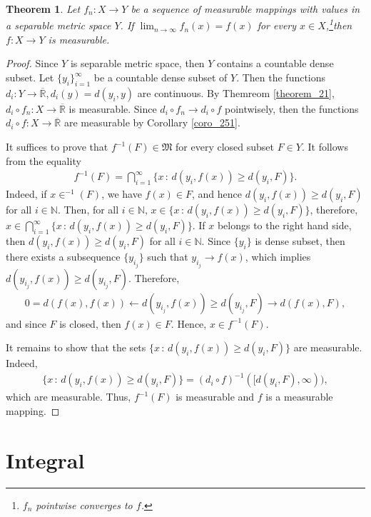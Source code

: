 \documentclass[11pt]{book}
\newtheorem{theorem}{Theorem}[chapter]
\theoremstyle{definition}
\numberwithin{equation}{chapter}
\begin{document}
\begin{theorem}\label{theorem_26}
Let $f_n: X \to Y$ be a sequence of measurable mappings with values in a separable metric space $Y$. If $\lim_{n\to\infty}f_n(x) = f(x)$ for every $x \in X$,\footnote{$f_n$ pointwise converges to $f$.}then $f: X \to Y$ is measurable.
\end{theorem}
\begin{proof}
Since $Y$ is separable metric space, then $Y$ contains a countable dense subset. Let $\{y_i\}^\infty_{i=1}$ be a countable dense subset of $Y$. Then the functions $d_i: Y \to \overline{\mathbb{R}}, d_i(y) = d(y_i,y)$ are continuous. By Themreom \ref{theorem_21}, $d_i \circ f_n: X \to \overline{\mathbb{R}}$ is measurable. Since $d_i \circ f_n \to d_i \circ f$ pointwisely, then the functions $d_i \circ f: X \to \overline{\mathbb{R}}$ are measurable by Corollary \ref{coro_251}. 

It suffices to prove that $f^{-1}(F) \in \mathfrak{M}$ for every closed subset $F \in Y$. It follows from the equality
\begin{align*}
    f^{-1}(F) = \bigcap^\infty_{i=1} \{x\,:\,d(y_i,f(x)) \geq d(y_i,F)\}.
\end{align*}
Indeed, if $x \in ^{-1}(F)$, we have $f(x) \in F$, and hence $d(y_i,f(x)) \geq d(y_i,F)$ for all $i \in \mathbb{N}$. Then, for all $i \in \mathbb{N}$, $x \in \{x\,:\,d(y_i,f(x)) \geq d(y_i,F)\}$, therefore, $x \in \bigcap^\infty_{i=1} \{x\,:\,d(y_i,f(x)) \geq d(y_i,F)\}$. If $x$ belongs to the right hand side, then $d(y_i,f(x)) \geq d(y_i,F)$ for all $i \in \mathbb{N}$. Since $\{y_i\}$ is dense subset, then there exists a subsequence $\{y_{i_j}\}$ such that $y_{i_j} \to f(x)$, which implies $d(y_{i_j},f(x)) \geq d(y_{i_j},F)$. Therefore,
\begin{align*}
    0 = d(f(x),f(x)) \leftarrow	d(y_{i_j},f(x)) \geq d(y_{i_j},F) \to d(f(x),F),
\end{align*}
and since $F$ is closed, then $f(x) \in F$. Hence, $x \in f^{-1}(F)$.

It remains to show that the sets $\{x\,:\,d(y_i,f(x)) \geq d(y_i,F)\}$ are measurable. Indeed,
\begin{align*}
    \{x\,:\,d(y_i,f(x)) \geq d(y_i,F)\} = (d_i \circ f)^{-1} ([d(y_i,F), \infty)),
\end{align*}
which are measurable. Thus, $f^{-1}(F)$ is measurable and $f$ is a measurable mapping.
\end{proof}

\medskip

\section{Integral}
\end{document}
